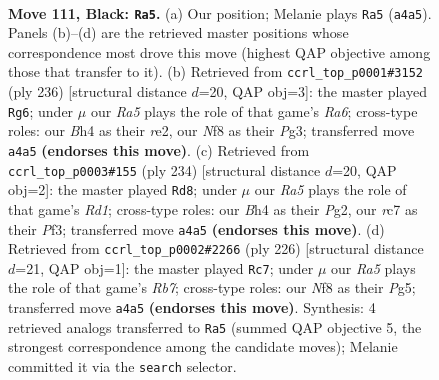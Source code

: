 \documentclass[11pt]{article}
\begin{document}
\clearpage

\begin{figure}[p]\centering
\begin{subfigure}{0.46\textwidth}\centering
\resizebox{\linewidth}{!}{%
\newchessgame
\chessboard[
  setfen={5n2/2R5/7p/4p3/r5kb/3p4/1K6/8 b - - 19 111},
  showmover=false,
  pgfstyle=straightmove, color=movearrow, markmove={a4-a5}
]}
\caption{}
\end{subfigure}\hfill
\begin{subfigure}{0.46\textwidth}\centering
\resizebox{\linewidth}{!}{%
\newchessgame
\chessboard[
  setfen={8/8/R7/2pk1p2/8/KP4P1/4r3/8 w - - 0 119},
  showmover=false,
  pgfstyle=straightmove, color=movearrow, markmove={a6-g6}
]}
\caption{}
\end{subfigure}
\\[4pt]
\begin{subfigure}{0.46\textwidth}\centering
\resizebox{\linewidth}{!}{%
\newchessgame
\chessboard[
  setfen={8/r7/6k1/8/5p2/5P2/6P1/3R2K1 w - - 43 118},
  showmover=false,
  pgfstyle=straightmove, color=movearrow, markmove={d1-d8}
]}
\caption{}
\end{subfigure}\hfill
\begin{subfigure}{0.46\textwidth}\centering
\resizebox{\linewidth}{!}{%
\newchessgame
\chessboard[
  setfen={5k2/1R6/r7/6PK/8/6P1/8/8 w - - 23 114},
  showmover=false,
  pgfstyle=straightmove, color=movearrow, markmove={b7-c7}
]}
\caption{}
\end{subfigure}
\caption{\textbf{Move 111, Black: \texttt{Ra5}.} (a) Our position; Melanie plays \texttt{Ra5} (\texttt{a4a5}). Panels (b)--(d) are the retrieved master positions whose correspondence most drove this move (highest QAP objective among those that transfer to it). (b) Retrieved from \texttt{ccrl\_top\_p0001\#3152} (ply 236) [structural distance $d$=20, QAP obj=3]: the master played \texttt{Rg6}; under $\mu$ our \emph{Ra5} plays the role of that game's \emph{Ra6}; cross-type roles: our \emph{B}h4 as their \emph{r}e2, our \emph{N}f8 as their \emph{P}g3; transferred move \texttt{a4a5} \textbf{(endorses this move)}. (c) Retrieved from \texttt{ccrl\_top\_p0003\#155} (ply 234) [structural distance $d$=20, QAP obj=2]: the master played \texttt{Rd8}; under $\mu$ our \emph{Ra5} plays the role of that game's \emph{Rd1}; cross-type roles: our \emph{B}h4 as their \emph{P}g2, our \emph{r}c7 as their \emph{P}f3; transferred move \texttt{a4a5} \textbf{(endorses this move)}. (d) Retrieved from \texttt{ccrl\_top\_p0002\#2266} (ply 226) [structural distance $d$=21, QAP obj=1]: the master played \texttt{Rc7}; under $\mu$ our \emph{Ra5} plays the role of that game's \emph{Rb7}; cross-type roles: our \emph{N}f8 as their \emph{P}g5; transferred move \texttt{a4a5} \textbf{(endorses this move)}. Synthesis: 4 retrieved analogs transferred to \texttt{Ra5} (summed QAP objective 5, the strongest correspondence among the candidate moves); Melanie committed it via the \texttt{search} selector.}
\label{fig:thought-m221}
\end{figure}
\end{document}
